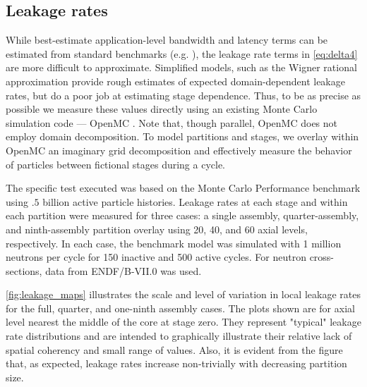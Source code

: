 \subsection{Leakage rates}
While best-estimate application-level bandwidth and latency terms can be
estimated from standard benchmarks (e.g. \cite{cpe-wallcraft-2000}), the leakage
rate terms in \eqref{eq:delta4} are more difficult to approximate. Simplified
models, such as the Wigner rational approximation \cite{ae-pashkin-1970} provide
rough estimates of expected domain-dependent leakage rates, but do a poor job at
estimating stage dependence. Thus, to be as precise as possible we measure these
values directly using an existing Monte Carlo simulation code --- OpenMC
\cite{ane-romano-2013}. Note that, though parallel, OpenMC does not employ
domain decomposition. To model partitions and stages, we overlay within OpenMC
an imaginary grid decomposition and effectively measure the behavior of
particles between fictional stages during a cycle.

The specific test executed was based on the Monte Carlo Performance benchmark
\cite{mc-hoogenboom-2011} using $.5$ billion active particle histories.  Leakage
rates at each stage and within each partition were measured for three cases: a
single assembly, quarter-assembly, and ninth-assembly partition overlay using
20, 40, and 60 axial levels, respectively. In each case, the benchmark model was
simulated with 1 million neutrons per cycle for 150 inactive and 500 active
cycles. For neutron cross-sections, data from ENDF/B-VII.0 was used.

\autoref{fig:leakage_maps} illustrates the scale and level of variation in local
leakage rates for the full, quarter, and one-ninth assembly cases.  The plots
shown are for axial level nearest the middle of the core at stage zero. They
represent "typical" leakage rate distributions and are intended to graphically
illustrate their relative lack of spatial coherency and small range of
values. Also, it is evident from the figure that, as expected, leakage rates
increase non-trivially with decreasing partition size.

